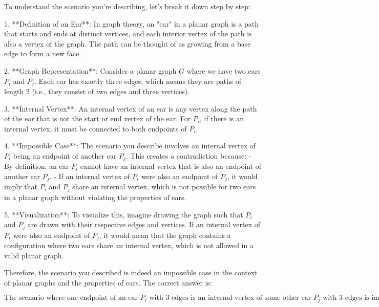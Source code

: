 To understand the scenario you're describing, let's break it down step by step:

1. **Definition of an Ear**: In graph theory, an "ear" in a planar graph is a path that starts and ends at distinct vertices, and each interior vertex of the path is also a vertex of the graph. The path can be thought of as growing from a base edge to form a new face.

2. **Graph Representation**: Consider a planar graph \( G \) where we have two ears \( P_i \) and \( P_j \). Each ear has exactly three edges, which means they are paths of length 2 (i.e., they consist of two edges and three vertices).

3. **Internal Vertex**: An internal vertex of an ear is any vertex along the path of the ear that is not the start or end vertex of the ear. For \( P_i \), if there is an internal vertex, it must be connected to both endpoints of \( P_i \).

4. **Impossible Case**: The scenario you describe involves an internal vertex of \( P_i \) being an endpoint of another ear \( P_j \). This creates a contradiction because:
   - By definition, an ear \( P_i \) cannot have an internal vertex that is also an endpoint of another ear \( P_j \).
   - If an internal vertex of \( P_i \) were also an endpoint of \( P_j \), it would imply that \( P_i \) and \( P_j \) share an internal vertex, which is not possible for two ears in a planar graph without violating the properties of ears.

5. **Visualization**: To visualize this, imagine drawing the graph such that \( P_i \) and \( P_j \) are drawn with their respective edges and vertices. If an internal vertex of \( P_i \) were also an endpoint of \( P_j \), it would mean that the graph contains a configuration where two ears share an internal vertex, which is not allowed in a valid planar graph.

Therefore, the scenario you described is indeed an impossible case in the context of planar graphs and the properties of ears. The correct answer is:

\[
\boxed{\text{The scenario where one endpoint of an ear } P_i \text{ with 3 edges is an internal vertex of some other ear } P_j \text{ with 3 edges is impossible.}}
\]